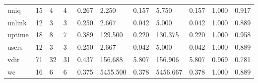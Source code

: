 \begin{longtable}{lp{1.8cm}p{1.8cm}p{1.8cm}p{1.8cm}p{1.8cm}p{1.8cm}p{1.8cm}p{1.8cm}p{1.8cm}p{1.8cm}}
uniq      &                           15 &                  4 &                                 4 &                                      0.267 &                                  2.250 &                                        0.157 &                             5.750 &                                   0.157 &                              1.000 &                                              0.917 \\
unlink    &                           12 &                  3 &                                 3 &                                      0.250 &                                  2.667 &                                        0.042 &                             5.000 &                                   0.042 &                              1.000 &                                              0.889 \\
uptime    &                           18 &                  8 &                                 7 &                                      0.389 &                                129.500 &                                        0.220 &                           130.375 &                                   0.220 &                              1.000 &                                              0.958 \\
users     &                           12 &                  3 &                                 3 &                                      0.250 &                                  2.667 &                                        0.042 &                             5.000 &                                   0.042 &                              1.000 &                                              0.889 \\
vdir      &                           71 &                 32 &                                31 &                                      0.437 &                                156.688 &                                        5.807 &                           156.906 &                                   5.807 &                              0.969 &                                              0.781 \\
wc        &                           16 &                  6 &                                 6 &                                      0.375 &                               5455.500 &                                        0.378 &                          5456.667 &                                   0.378 &                              1.000 &                                              0.889 \\

\end{longtable}
